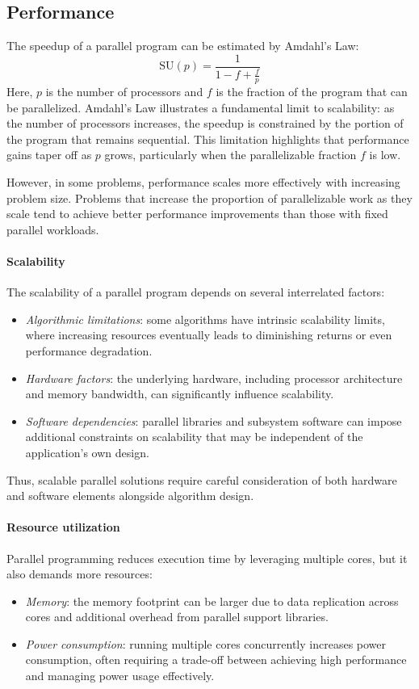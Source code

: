 \subsection{Performance}
The speedup of a parallel program can be estimated by Amdahl's Law:
\[\text{SU}(p)=\dfrac{1}{1-f+\frac{f}{p}}\]
Here, $p$ is the number of processors and $f$ is the fraction of the program that can be parallelized.
Amdahl's Law illustrates a fundamental limit to scalability: as the number of processors increases, the speedup is constrained by the portion of the program that remains sequential. 
This limitation highlights that performance gains taper off as $p$ grows, particularly when the parallelizable fraction $f$ is low.

However, in some problems, performance scales more effectively with increasing problem size. 
Problems that increase the proportion of parallelizable work as they scale tend to achieve better performance improvements than those with fixed parallel workloads.

\paragraph*{Scalability}
The scalability of a parallel program depends on several interrelated factors:
\begin{itemize}
    \item \textit{Algorithmic limitations}: some algorithms have intrinsic scalability limits, where increasing resources eventually leads to diminishing returns or even performance degradation.
    \item \textit{Hardware factors}: the underlying hardware, including processor architecture and memory bandwidth, can significantly influence scalability.
    \item \textit{Software dependencies}: parallel libraries and subsystem software can impose additional constraints on scalability that may be independent of the application's own design.
\end{itemize}
Thus, scalable parallel solutions require careful consideration of both hardware and software elements alongside algorithm design.

\paragraph*{Resource utilization}
Parallel programming reduces execution time by leveraging multiple cores, but it also demands more resources:
\begin{itemize}
    \item \textit{Memory}: the memory footprint can be larger due to data replication across cores and additional overhead from parallel support libraries.
    \item \textit{Power consumption}: running multiple cores concurrently increases power consumption, often requiring a trade-off between achieving high performance and managing power usage effectively.
\end{itemize}

